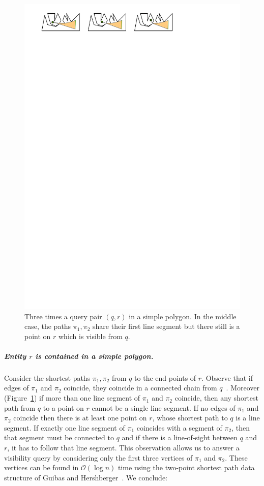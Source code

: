 \documentclass[UKenglish]{lipics-v2019}
\newcommand{\mkmcal}[1]{\ensuremath{\mathcal{#1}}\xspace}
\renewcommand{\O}{\mkmcal{O}}
\begin{document}
\begin{figure}[h]
    \centering
    \includegraphics[]{../funnel}
    \caption{Three times a query pair $(q,r)$ in a simple polygon. In the middle case, the paths $\pi_1, \pi_2$ share their first line segment but there still is a point on $r$ which is visible from $q$.}
    \label{fig:funnel}
\end{figure}

\subparagraph{Entity $r$ is contained in a simple polygon.} Consider
the shortest paths $\pi_1, \pi_2$ from $q$ to the end points of
$r$. Observe that if edges of $\pi_1$ and $\pi_2$ coincide, they
coincide in a connected chain from $q$~\cite{guibas1989optimal}. Moreover
(Figure~\ref{fig:funnel}) if more than one line segment of $\pi_1$ and
$\pi_2$ coincide, then any shortest path from $q$ to a point on $r$
cannot be a single line segment. If no edges of $\pi_1$ and $\pi_2$
coincide then there is at least one point on $r$, whose shortest path
to $q$ is a line segment. If exactly one line segment of $\pi_1$
coincides with a segment of $\pi_2$, then that segment must be
connected to $q$ and if there is a line-of-sight between $q$ and $r$,
it has to follow that line segment. This observation allows us to
answer a visibility query by considering only the first three vertices
of $\pi_1$ and $\pi_2$. These vertices can be found in $\O(\log n)$
time using the two-point shortest path data structure of Guibas and
Hershberger~\cite{guibas1989optimal}. We conclude:
\end{document}
